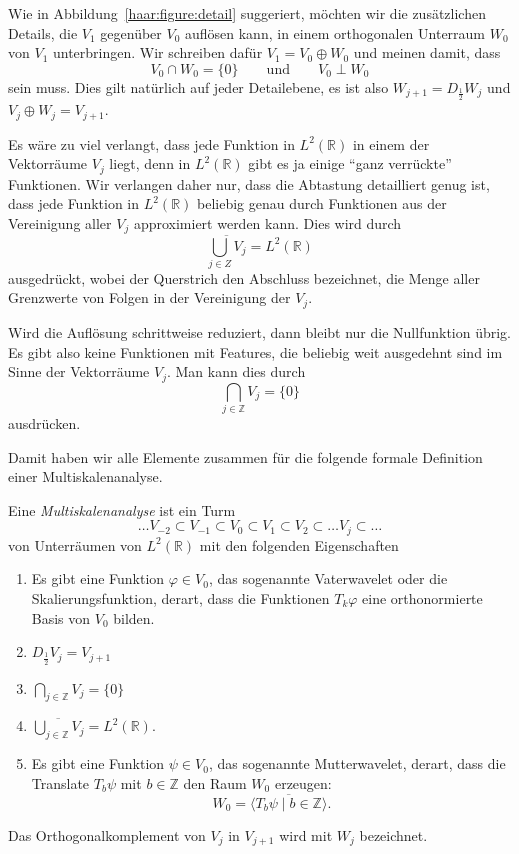 Wie in Abbildung~\ref{haar:figure:detail} suggeriert,
möchten wir die zusätzlichen Details, die $V_1$ gegenüber $V_0$ auflösen kann,
in einem orthogonalen Unterraum $W_0$ von $V_1$ unterbringen.
Wir schreiben dafür $V_1 = V_0 \oplus W_0$ und meinen damit, dass
\[
V_0\cap W_0= \{0\}
\qquad\text{und}\qquad
V_0 \perp W_0
\]
sein muss.
Dies gilt natürlich auf jeder Detailebene, es ist also
$W_{j+1} = D_{\frac12}W_j$ und $V_j\oplus W_j = V_{j+1}$.

Es wäre zu viel verlangt, dass jede Funktion in $L^2(\mathbb R)$ in
einem der Vektorräume $V_j$ liegt, denn in $L^2(\mathbb R)$ gibt
es ja einige ``ganz verrückte'' Funktionen.
Wir verlangen daher nur, dass die Abtastung detailliert genug ist, dass jede 
Funktion in $L^2(\mathbb R)$ beliebig genau durch Funktionen aus
der Vereinigung aller $V_j$ approximiert werden kann.
Dies wird durch
\[
\overline{\bigcup_{j\in Z} V_j} = L^2(\mathbb R)
\]
ausgedrückt, wobei der Querstrich den Abschluss bezeichnet, die Menge
aller Grenzwerte von Folgen in der Vereinigung der $V_j$.

Wird die Auflösung schrittweise reduziert, dann bleibt nur die Nullfunktion
übrig.
Es gibt also keine Funktionen mit Features, die beliebig weit ausgedehnt
sind im Sinne der Vektorräume $V_j$.
Man kann dies durch
\[
\bigcap_{j\in\mathbb Z} V_j = \{0\}
\]
ausdrücken.

Damit haben wir alle Elemente zusammen für die folgende formale Definition
einer Multiskalenanalyse.

\begin{definition}
Eine {\em Multiskalenanalyse} ist ein Turm
%
\[
\dots
V_{-2}\subset
V_{-1}\subset
V_0\subset
V_1\subset
V_2\subset
\dots
V_j\subset
\dots
\]
von Unterräumen von $L^2(\mathbb R)$ mit den folgenden Eigenschaften
\begin{enumerate}
\item Es gibt eine Funktion $\varphi\in V_0$, das sogenannte Vaterwavelet oder
die Skalierungsfunktion,
%
%
derart, dass die Funktionen
$T_k\varphi$ eine orthonormierte Basis von $V_0$ bilden.
\item $D_{\frac12} V_j = V_{j+1}$
\item $\displaystyle\bigcap_{j\in\mathbb Z} V_j = \{0\}$
\item $\displaystyle\overline{\bigcup_{j\in\mathbb Z} V_j} = L^2(\mathbb R)$.
\item Es gibt eine Funktion $\psi\in V_0$, das sogenannte
Mutterwavelet, derart, dass
%
die Translate $T_b\psi$ mit $b\in\mathbb Z$ den Raum $W_0$ erzeugen:
\[
W_0 = \overline{\langle T_b\psi\;|\;b\in\mathbb Z\rangle}.
\]
\end{enumerate}
Das Orthogonalkomplement von $V_j$ in $V_{j+1}$ wird mit $W_j$ bezeichnet.
%
\end{definition}

